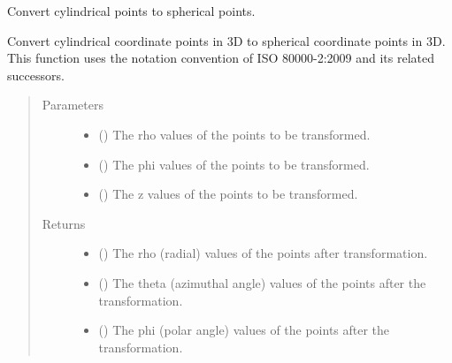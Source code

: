 \documentclass[letterpaper,10pt,english]{sphinxmanual}
\begin{document}

\begin{fulllineitems}
\label{\detokenize{Backend.coordinate_system_transformation:Backend.coordinate_system_transformation.cylindrical_to_spherical_3d}}
Convert cylindrical points to spherical points.

Convert cylindrical coordinate points in 3D to spherical coordinate points
in 3D. This function uses the notation convention of ISO 80000-2:2009 and
its related successors.
\begin{quote}\begin{description}
\item[{Parameters}] \leavevmode\begin{itemize}
\item {} 
 () \textendash{} The rho values of the points to be transformed.

\item {} 
 () \textendash{} The phi values of the points to be transformed.

\item {} 
 () \textendash{} The z values of the points to be transformed.

\end{itemize}

\item[{Returns}] \leavevmode
\begin{itemize}
\item {} 
 () \textendash{} The rho (radial) values of the points after transformation.

\item {} 
 () \textendash{} The theta (azimuthal angle) values of the points after the
transformation.

\item {} 
 () \textendash{} The phi (polar angle) values of the points after the transformation.

\end{itemize}


\end{description}\end{quote}

\end{fulllineitems}
\end{document}
